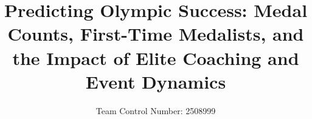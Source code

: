 \documentclass[12pt,a4paper]{article}
\begin{document}
\title{Predicting Olympic Success: Medal Counts, First-Time Medalists, and the Impact of Elite Coaching and Event Dynamics}
\author{Team Control Number: 2508999}
\date{}
\maketitle

\end{document}
